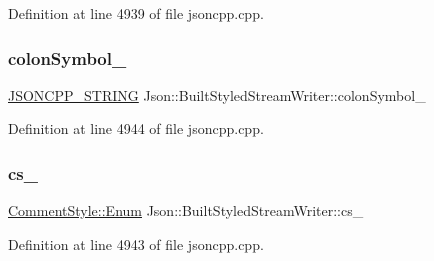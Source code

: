 Definition at line 4939 of file jsoncpp.\+cpp.

\hypertarget{struct_json_1_1_built_styled_stream_writer_a9f10991ddef9b77d0b580e24e71483c6}{}\label{struct_json_1_1_built_styled_stream_writer_a9f10991ddef9b77d0b580e24e71483c6} 
\subsubsection{\texorpdfstring{colon\+Symbol\+\_\+}{colonSymbol\_}}
{\footnotesize\ttfamily \hyperlink{config_8h_a1e723f95759de062585bc4a8fd3fa4be}{J\+S\+O\+N\+C\+P\+P\+\_\+\+S\+T\+R\+I\+NG} Json\+::\+Built\+Styled\+Stream\+Writer\+::colon\+Symbol\+\_\+\hspace{0.3cm}{\ttfamily [private]}}



Definition at line 4944 of file jsoncpp.\+cpp.

\hypertarget{struct_json_1_1_built_styled_stream_writer_a89a9c76c7531143b52785861ba21c1d4}{}\label{struct_json_1_1_built_styled_stream_writer_a89a9c76c7531143b52785861ba21c1d4} 
\subsubsection{\texorpdfstring{cs\+\_\+}{cs\_}}
{\footnotesize\ttfamily \hyperlink{struct_json_1_1_comment_style_a51fc08f3518fd81eba12f340d19a3d0c}{Comment\+Style\+::\+Enum} Json\+::\+Built\+Styled\+Stream\+Writer\+::cs\+\_\+\hspace{0.3cm}{\ttfamily [private]}}



Definition at line 4943 of file jsoncpp.\+cpp.

\hypertarget{struct_json_1_1_built_styled_stream_writer_a5e61a9a4b2af52b98900286c843b86f7}{}\label{struct_json_1_1_built_styled_stream_writer_a5e61a9a4b2af52b98900286c843b86f7} 
